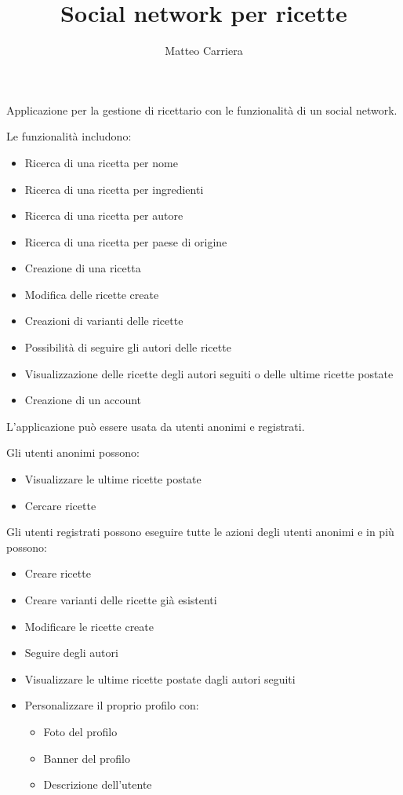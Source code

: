 \documentclass[a4paper]{article}
\begin{document}
\title{Social network per ricette}
\author{Matteo Carriera}
\date{}


\maketitle
Applicazione per la gestione di ricettario con le funzionalità di un social network. \newline

Le funzionalità includono:
\begin{itemize}
    \item Ricerca di una ricetta per nome
    \item Ricerca di una ricetta per ingredienti
    \item Ricerca di una ricetta per autore
    \item Ricerca di una ricetta per paese di origine
    \item Creazione di una ricetta
    \item Modifica delle ricette create
    \item Creazioni di varianti delle ricette
    \item Possibilità di seguire gli autori delle ricette
    \item Visualizzazione delle ricette degli autori seguiti o delle ultime ricette postate
    \item Creazione di un account
\end{itemize} 

\vspace{3mm}
L'applicazione può essere usata da utenti anonimi e registrati. \newline

Gli utenti anonimi possono: 
\begin{itemize}
    \item Visualizzare le ultime ricette postate
    \item Cercare ricette
\end{itemize}

\vspace{3mm}

Gli utenti registrati possono eseguire tutte le azioni degli utenti anonimi e in più possono:
\begin{itemize}
    \item Creare ricette
    \item Creare varianti delle ricette già esistenti
    \item Modificare le ricette create
    \item Seguire degli autori
    \item Visualizzare le ultime ricette postate dagli autori seguiti
    \item Personalizzare il proprio profilo con:
    \begin{itemize}
        \item Foto del profilo
        \item Banner del profilo
        \item Descrizione dell'utente
    \end{itemize}
\end{itemize}
\end{document}

